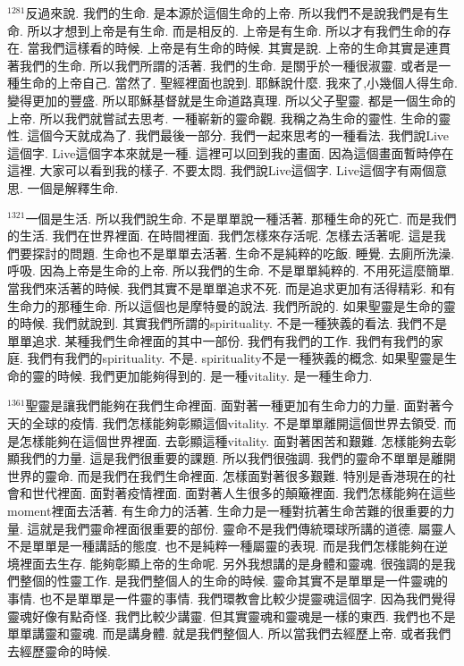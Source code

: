 \documentclass{book}
\begin{document}
$^{1281}$反過來說.
我們的生命.
是本源於這個生命的上帝.
所以我們不是說我們是有生命.
所以才想到上帝是有生命.
而是相反的.
上帝是有生命.
所以才有我們生命的存在.
當我們這樣看的時候.
上帝是有生命的時候.
其實是說.
上帝的生命其實是連貫著我們的生命.
所以我們所謂的活著.
我們的生命.
是關乎於一種很淑靈.
或者是一種生命的上帝自己.
當然了.
聖經裡面也說到.
耶穌說什麼.
我來了,小幾個人得生命.
變得更加的豐盛.
所以耶穌基督就是生命道路真理.
所以父子聖靈.
都是一個生命的上帝.
所以我們就嘗試去思考.
一種嶄新的靈命觀.
我稱之為生命的靈性.
生命的靈性.
這個今天就成為了.
我們最後一部分.
我們一起來思考的一種看法.
我們說Live這個字.
Live這個字本來就是一種.
這裡可以回到我的畫面.
因為這個畫面暫時停在這裡.
大家可以看到我的樣子.
不要太悶.
我們說Live這個字.
Live這個字有兩個意思.
一個是解釋生命.

$^{1321}$一個是生活.
所以我們說生命.
不是單單說一種活著.
那種生命的死亡.
而是我們的生活.
我們在世界裡面.
在時間裡面.
我們怎樣來存活呢.
怎樣去活著呢.
這是我們要探討的問題.
生命也不是單單去活著.
生命不是純粹的吃飯.
睡覺.
去廁所洗澡.
呼吸.
因為上帝是生命的上帝.
所以我們的生命.
不是單單純粹的.
不用死這麼簡單.
當我們來活著的時候.
我們其實不是單單追求不死.
而是追求更加有活得精彩.
和有生命力的那種生命.
所以這個也是摩特曼的說法.
我們所說的.
如果聖靈是生命的靈的時候.
我們就說到.
其實我們所謂的spirituality.
不是一種狹義的看法.
我們不是單單追求.
某種我們生命裡面的其中一部份.
我們有我們的工作.
我們有我們的家庭.
我們有我們的spirituality.
不是.
spirituality不是一種狹義的概念.
如果聖靈是生命的靈的時候.
我們更加能夠得到的.
是一種vitality.
是一種生命力.

$^{1361}$聖靈是讓我們能夠在我們生命裡面.
面對著一種更加有生命力的力量.
面對著今天的全球的疫情.
我們怎樣能夠彰顯這個vitality.
不是單單離開這個世界去領受.
而是怎樣能夠在這個世界裡面.
去彰顯這種vitality.
面對著困苦和艱難.
怎樣能夠去彰顯我們的力量.
這是我們很重要的課題.
所以我們很強調.
我們的靈命不單單是離開世界的靈命.
而是我們在我們生命裡面.
怎樣面對著很多艱難.
特別是香港現在的社會和世代裡面.
面對著疫情裡面.
面對著人生很多的顛簸裡面.
我們怎樣能夠在這些moment裡面去活著.
有生命力的活著.
生命力是一種對抗著生命苦難的很重要的力量.
這就是我們靈命裡面很重要的部份.
靈命不是我們傳統環球所講的道德.
屬靈人不是單單是一種講話的態度.
也不是純粹一種屬靈的表現.
而是我們怎樣能夠在逆境裡面去生存.
能夠彰顯上帝的生命呢.
另外我想講的是身體和靈魂.
很強調的是我們整個的性靈工作.
是我們整個人的生命的時候.
靈命其實不是單單是一件靈魂的事情.
也不是單單是一件靈的事情.
我們環教會比較少提靈魂這個字.
因為我們覺得靈魂好像有點奇怪.
我們比較少講靈.
但其實靈魂和靈魂是一樣的東西.
我們也不是單單講靈和靈魂.
而是講身體.
就是我們整個人.
所以當我們去經歷上帝.
或者我們去經歷靈命的時候.
\end{document}
